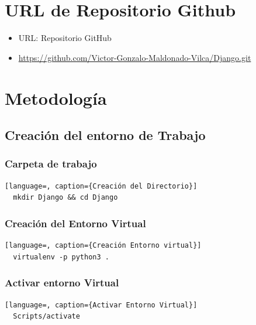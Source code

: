 \documentclass{article}
\begin{document}

	\section{URL de Repositorio Github}
  \begin{itemize}
    \item URL: Repositorio GitHub
    \item \url{https://github.com/Victor-Gonzalo-Maldonado-Vilca/Django.git}
  \end{itemize}


  \section{Metodología}
  
  
  \subsection{Creación del entorno de Trabajo}
  

  \subsubsection{Carpeta de trabajo}
  \begin{lstlisting}[language=, caption={Creación del Directorio}]
  mkdir Django && cd Django
  \end{lstlisting}
  

  \subsubsection{Creación del Entorno Virtual}
  \begin{lstlisting}[language=, caption={Creación Entorno virtual}]
  virtualenv -p python3 .
  \end{lstlisting}
  \newpage
  

  \subsubsection{Activar entorno Virtual}
  \begin{lstlisting}[language=, caption={Activar Entorno Virtual}]
  Scripts/activate
  \end{lstlisting}
  
\end{document}
